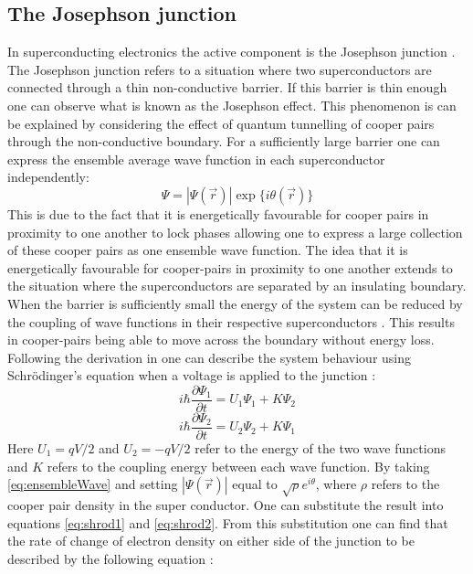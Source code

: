 \subsection{The Josephson junction}
In superconducting electronics the active component is the Josephson junction \cite{Duzer_1999_Princip_Super}. The Josephson junction refers to a situation where two superconductors are connected through a thin non-conductive barrier. If this barrier is thin enough one can observe what is known as the Josephson effect. This phenomenon is can be explained by considering the effect of quantum tunnelling of cooper pairs through the non-conductive boundary. For a sufficiently large barrier one can express the ensemble average wave function in each superconductor independently\cite{Duzer_1999_Princip_Super}:
\begin{equation}
    \Psi = |\Psi(\Vec{r})| \exp{\{i\theta(\Vec{r})\}}
    \label{eq:ensembleWave}
\end{equation}
This is due to the fact that it is energetically favourable for cooper pairs in proximity to one another to lock phases \cite{Duzer_1999_Princip_Super} allowing one to express a large collection of these cooper pairs as one ensemble wave function. The idea that it is energetically favourable for cooper-pairs in proximity to one another extends to the situation where the superconductors are separated by an insulating boundary. When the barrier is sufficiently small the energy of the system can be reduced by the coupling of wave functions in their respective superconductors \cite{Duzer_1999_Princip_Super}. This results in cooper-pairs being able to move across the boundary without energy loss. Following the derivation in \cite{Feynman_Leighton_Sands_2013} one can describe the system behaviour using Schrödinger's equation when a voltage is applied to the junction \cite{Feynman_Leighton_Sands_2013}: 
\begin{equation}
    i\hbar \frac{\partial\Psi_1}{\partial t} = U_1\Psi_1 +K\Psi_2 
    \label{eq:shrod1}
\end{equation}
\begin{equation}
    i\hbar \frac{\partial\Psi_2}{\partial t} = U_2\Psi_2 +K\Psi_1
    \label{eq:shrod2}
\end{equation}
Here $U_1 = qV/2$ and $U_2 = -qV/2$ \cite{Feynman_Leighton_Sands_2013} refer to the energy of the two wave functions and $K$ refers to the coupling energy between each wave function. By taking \ref{eq:ensembleWave} and setting $|\Psi(\Vec{r})|$ equal to $\sqrt{\rho}e^{i\theta}$, where $\rho$ refers to the cooper pair density in the super conductor. One can substitute the result into equations \ref{eq:shrod1} and \ref{eq:shrod2}. From this substitution one can find that the rate of change of electron density on either side of the junction to be described by the following equation \cite{Feynman_Leighton_Sands_2013}:

